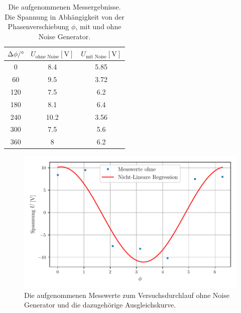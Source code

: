 \begin{table} 
  \centering
  \caption{Die aufgenommenen Messergebnisse. Die Spannung in Abhängigkeit von der Phasenverschiebung $\phi$, mit und ohne Noise Generator. } 
  \label{tab:data_ohne_mit}
  \begin{tabular}{c c c}
    \toprule
    $\increment \phi /°$ & $U_\text{ohne Noise} [\si{\volt}]$ & $U_\text{mit Noise} [\si{\volt}]$ \\
    \midrule
    0    &   8.4   &  5.85  \\
    60   &   9.5   &  3.72  \\
    120  &   7.5   &  6.2   \\
    180  &   8.1   &  6.4   \\
    240  &   10.2  &  3.56  \\
    300  &   7.5   &  5.6   \\
    360  &   8     &  6.2   \\
    \bottomrule
  \end{tabular}
\end{table}

\begin{figure}
      \centering
      \includegraphics[width=\textwidth]{bilder/plot1.pdf}
      \caption{Die aufgenommenen Messwerte zum Versuchsdurchlauf ohne Noise Generator und die dazugehörige Ausgleichskurve.}
      \label{fig:ohne_noise}
\end{figure}

